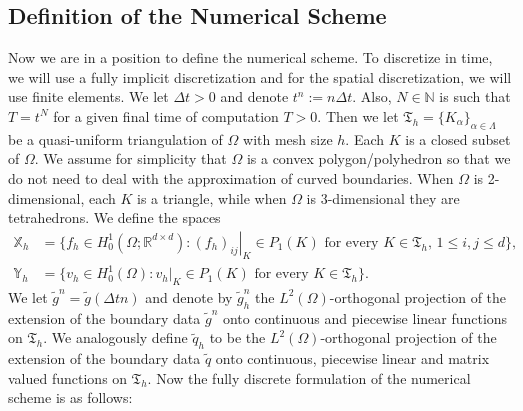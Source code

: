 \documentclass[10pt,letterpaper]{amsart}
\newcommand{\R}{\mathbb{R}}
\newcommand{\N}{\mathbb{N}}
\theoremstyle{definition}{\newtheorem{definition}[lemma]{Definition}}
\theoremstyle{note}{\newtheorem{claim}{Claim}[section]
\newtheorem*{claim*}{Claim}}
\numberwithin{equation}{section}
\begin{document}
\subsection{Definition of the Numerical Scheme}
Now we are in a position to define the numerical scheme. To discretize in time, we will use a fully implicit discretization and for the spatial discretization, we will use finite elements. We let $\Delta t>0$ and denote $t^n := n\Delta t$. Also, $N\in\N$ is such that $T = t^N$ for a given final time of computation $T>0$. Then we let $\mathfrak{T}_h = \{K_\alpha\}_{\alpha\in\Lambda}$ be a quasi-uniform triangulation of $\Omega$ with mesh size $h$. Each $K$ is a closed subset of $\Omega$. We assume for simplicity that $\Omega$ is a convex polygon/polyhedron so that we do not need to deal with the approximation of curved boundaries. When $\Omega$ is 2-dimensional, each $K$ is a triangle, while when $\Omega$ is 3-dimensional they are tetrahedrons. We define the spaces 
\begin{subequations}
	\begin{align}
	\mathbb{X}_h &= \{f_h \in H_0^1(\Omega; \R^{d\times d}): \left.(f_h)_{ij}\right\rvert_K \in P_1(K) \text{ for every } K\in\mathfrak{T}_h,\, 1\le i,j\le d\},\\
	\mathbb{Y}_h &= \{v_h \in H_0^1(\Omega): \left.v_h\right\rvert_K \in P_1(K) \text{ for every } K\in\mathfrak{T}_h\}.
	\end{align}
\end{subequations}
We let $\tilde g^n= \tilde g(\Delta t n)$ and denote by $\tilde g_h^n$ the $L^2(\Omega)$-orthogonal projection of the extension of the boundary data $\tilde g^n$ onto continuous and piecewise linear functions on $\mathfrak{T}_h$. We analogously define $\tilde q_h$ to be the $L^2(\Omega)$-orthogonal projection of the extension of the boundary data $\tilde q$ onto continuous, piecewise linear and matrix valued functions on $\mathfrak{T}_h$. Now the fully discrete formulation of the numerical scheme is as follows: 
\end{document}
